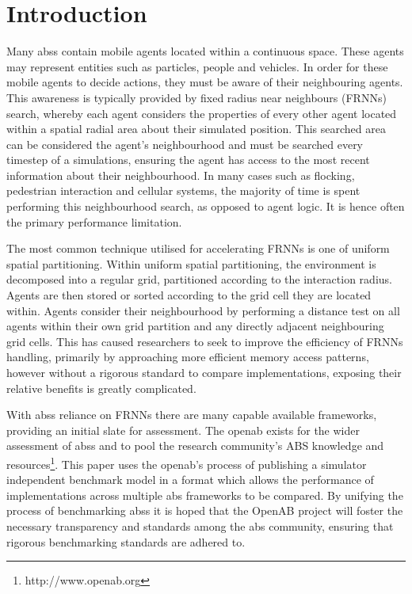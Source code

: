 \section{Introduction}
  Many \glspl{abs} contain mobile agents located within a continuous space. These agents may represent entities such as particles, people and vehicles. In order for these mobile agents to decide actions, they must be aware of their neighbouring agents. This awareness is typically provided by fixed radius near neighbours (FRNNs) search, whereby each agent considers the properties of every other agent located within a spatial radial area about their simulated position. This searched area can be considered the agent's neighbourhood and must be searched every timestep of a simulations, ensuring the agent has access to the most recent information about their neighbourhood. In many cases such as flocking, pedestrian interaction and cellular systems, the majority of time is spent performing this neighbourhood search, as opposed to agent logic. It is hence often the primary performance limitation.
  
  The most common technique utilised for accelerating FRNNs is one of uniform spatial partitioning. Within uniform spatial partitioning, the environment is decomposed into a regular grid, partitioned according to the interaction radius. Agents are then stored or sorted according to the grid cell they are located within. Agents consider their neighbourhood by performing a distance test on all agents within their own grid partition and any directly adjacent neighbouring grid cells. This has caused researchers to seek to improve the efficiency of FRNNs handling, primarily by approaching more efficient memory access patterns\cite{GS*10,Hoe14,HY*15}, however without a rigorous standard to compare implementations, exposing their relative benefits is greatly complicated.
  
  With \glspl{abs} reliance on FRNNs there are many capable available frameworks, providing an initial slate for assessment. The \gls{openab} exists for the wider assessment of \glspl{abs} and to pool the research community's ABS knowledge and resources\footnote{http://www.openab.org}. This paper uses the \gls{openab}'s process of publishing a simulator independent benchmark model in a format which allows the performance of implementations across multiple \gls{abs} frameworks to be compared. By unifying the process of benchmarking \glspl{abs} it is hoped that the OpenAB project will foster the necessary transparency and standards among the \gls{abs} community, ensuring that rigorous benchmarking standards are adhered to.
  
